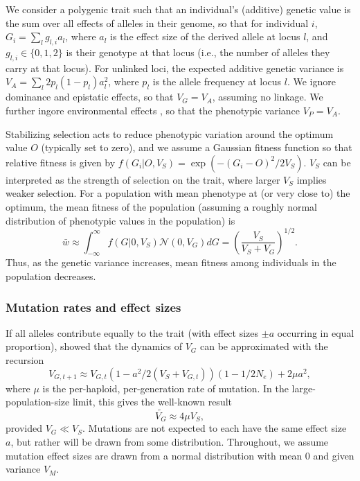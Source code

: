\documentclass{article}
\begin{document}
We consider a polygenic trait such that an individual's (additive) genetic
value is the sum over all effects of alleles in their genome, so that for
individual $i$, \(G_i = \sum_l g_{l, i} a_l\), where $a_l$ is the effect size
of the derived allele at locus $l$, and \(g_{l,i}\in\{0,1,2\}\) is their
genotype at that locus (i.e., the number of alleles they carry at that locus).
For unlinked loci, the expected additive genetic variance is \(V_A = \sum_l
2p_l(1-p_l)a_l^2\), where $p_l$ is the allele frequency at locus $l$. We ignore
dominance and epistatic effects, so that \(V_G = V_A\), assuming no linkage.
We further ingore environmental effects \citep{simons2018population}, so that
the phenotypic variance \(V_P=V_A\).

Stabilizing selection acts to reduce phenotypic variation around the optimum
value $O$ (typically set to zero), and we assume a Gaussian fitness function so
that relative fitness is given by \(f(G_i | O, V_S) = \exp{(-(G_i - O)^2 / 2
V_S)}\). $V_S$ can be interpreted as the strength of selection on the trait,
where larger $V_S$ implies weaker selection. For a population with mean
phenotype at (or very close to) the optimum, the mean fitness of the population
(assuming a roughly normal distribution of phenotypic values in the population)
is \[\bar{w} \approx \int_{-\infty}^\infty f(G | 0, V_S) \mathcal{N}(0, V_G) dG
= \left(\frac{V_S}{V_S+V_G}\right)^{1/2}.\] Thus, as the genetic variance
increases, mean fitness among individuals in the population decreases.

\subsubsection*{Mutation rates and effect sizes}

If all alleles contribute equally to the trait
(with effect sizes \(\pm a\) occurring in equal proportion),
\citet{keightley1988quantitative} showed that the dynamics of $V_G$ can be
approximated with the recursion
\[V_{G,t+1} \approx V_{G,t}\left(1-a^2/2(V_S+V_{G,t})\right)
\left(1-1/2N_e\right) + 2 \mu a^2,\]
where $\mu$ is the per-haploid, per-generation rate of mutation. In the
large-population-size limit, this gives the well-known result
\[\tilde{V_G} \approx 4\mu V_S,\] provided \(V_G \ll V_S\).
Mutations are not expected to each have the same effect size $a$, but
rather will be drawn from some distribution. Throughout, we assume mutation
effect sizes are drawn from a normal distribution with mean 0 and given
variance $V_M$.
\end{document}
